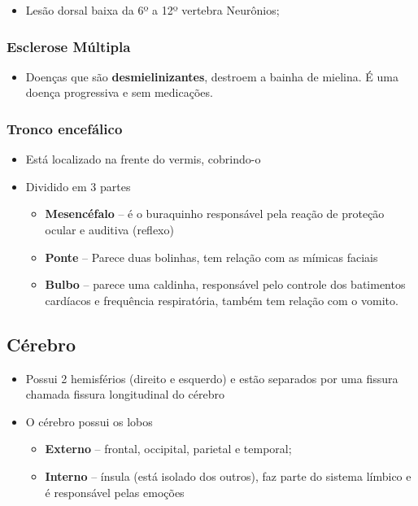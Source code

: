 \documentclass[
]{book}
\providecommand{\tightlist}{%
  \setlength{\itemsep}{0pt}\setlength{\parskip}{0pt}}
\begin{document}
\begin{itemize}
\tightlist
\item
  Lesão dorsal baixa da 6º a 12º vertebra Neurônios;
\end{itemize}

\hypertarget{esclerose-muxfaltipla}{%
\subsubsection{Esclerose Múltipla}\label{esclerose-muxfaltipla}}

\begin{itemize}
\tightlist
\item
  Doenças que são \textbf{desmielinizantes}, destroem a bainha de mielina. É uma doença progressiva e sem medicações.
\end{itemize}

\hypertarget{tronco-encefuxe1lico}{%
\subsubsection{Tronco encefálico}\label{tronco-encefuxe1lico}}

\begin{itemize}
\tightlist
\item
  Está localizado na frente do vermis, cobrindo-o
\item
  Dividido em 3 partes

  \begin{itemize}
  \tightlist
  \item
    \textbf{Mesencéfalo} -- é o buraquinho responsável pela reação de proteção ocular e auditiva
    (reflexo)
  \item
    \textbf{Ponte} -- Parece duas bolinhas, tem relação com as mímicas faciais
  \item
    \textbf{Bulbo} -- parece uma caldinha, responsável pelo controle dos batimentos cardíacos e frequência respiratória, também tem relação com o vomito.
  \end{itemize}
\end{itemize}

\hypertarget{cuxe9rebro}{%
\subsection{Cérebro}\label{cuxe9rebro}}

\begin{itemize}
\tightlist
\item
  Possui 2 hemisférios (direito e esquerdo) e estão separados por uma fissura chamada fissura longitudinal do cérebro
\item
  O cérebro possui os lobos

  \begin{itemize}
  \tightlist
  \item
    \textbf{Externo} -- frontal, occipital, parietal e temporal;
  \item
    \textbf{Interno} -- ínsula (está isolado dos outros), faz parte do sistema límbico e é responsável pelas emoções
  \end{itemize}
\end{itemize}
\end{document}
